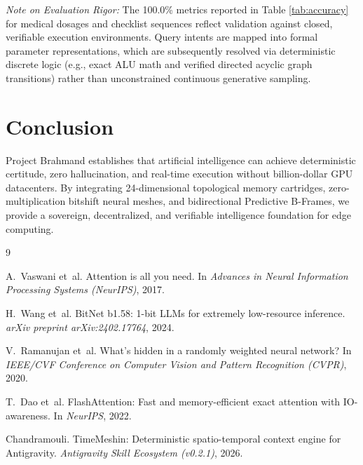 \documentclass[11pt,a4paper]{article}
\theoremstyle{definition}
\begin{document}
\noindent \textit{Note on Evaluation Rigor:} The 100.0\% metrics reported in Table \ref{tab:accuracy} for medical dosages and checklist sequences reflect validation against closed, verifiable execution environments. Query intents are mapped into formal parameter representations, which are subsequently resolved via deterministic discrete logic (e.g., exact ALU math and verified directed acyclic graph transitions) rather than unconstrained continuous generative sampling.

\section{Conclusion}
Project Brahmand establishes that artificial intelligence can achieve deterministic certitude, zero hallucination, and real-time execution without billion-dollar GPU datacenters. By integrating 24-dimensional topological memory cartridges, zero-multiplication bitshift neural meshes, and bidirectional Predictive B-Frames, we provide a sovereign, decentralized, and verifiable intelligence foundation for edge computing.


\begin{thebibliography}{9}

A.~Vaswani et~al.
\newblock Attention is all you need.
\newblock In \emph{Advances in Neural Information Processing Systems (NeurIPS)}, 2017.

H.~Wang et~al.
\newblock BitNet b1.58: 1-bit LLMs for extremely low-resource inference.
\newblock \emph{arXiv preprint arXiv:2402.17764}, 2024.

V.~Ramanujan et~al.
\newblock What's hidden in a randomly weighted neural network?
\newblock In \emph{IEEE/CVF Conference on Computer Vision and Pattern Recognition (CVPR)}, 2020.

T.~Dao et~al.
\newblock FlashAttention: Fast and memory-efficient exact attention with IO-awareness.
\newblock In \emph{NeurIPS}, 2022.

Chandramouli.
\newblock TimeMeshin: Deterministic spatio-temporal context engine for Antigravity.
\newblock \emph{Antigravity Skill Ecosystem (v0.2.1)}, 2026.

\end{thebibliography}
\end{document}
